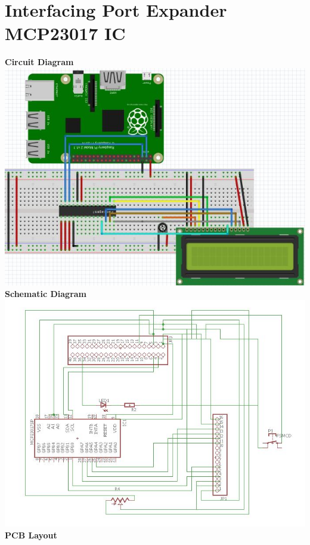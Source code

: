 \documentclass[a4paper,12pt,oneside]{book}
\begin{document}
\section{Interfacing Port Expander MCP23017 IC}
\flushleft
\textbf{Circuit Diagram}\\
\centering
\includegraphics[scale=0.4]{port_expander_lcd}
\flushleft
\textbf{Schematic Diagram}\\
\centering
\includegraphics[scale= 0.8]{LCD_schematic}
\flushleft
\textbf{PCB Layout}\\
\centering
\end{document}

